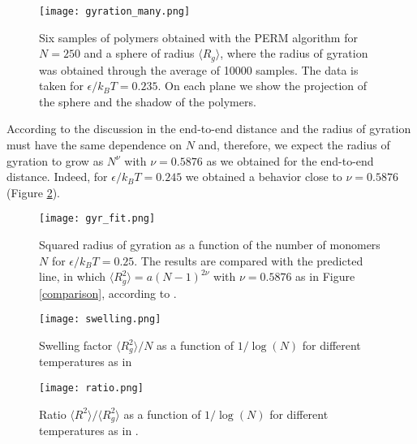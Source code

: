 \documentclass[aps,prl,reprint,groupedaddress]{revtex4-1}
\begin{document}
\begin{figure}[tb]
	\texttt{[image: gyration\_many.png]}
	\caption{Six samples of polymers obtained with the PERM algorithm for $N=250$ and a sphere of radius $\langle R_g\rangle$, where the radius of gyration was obtained through the average of 10000 samples. The data is taken for $\epsilon/k_B T = 0.235$. On each plane we show the projection of the sphere and the shadow of the polymers. \label{gyration_idea}}
\end{figure}

According to the discussion in \cite{Smith1975} the end-to-end distance and the radius of gyration must have the same dependence on $N$ and, therefore, we expect the radius of gyration to grow as $N^{\nu}$ with $\nu = 0.5876$ as we obtained for the end-to-end distance. Indeed, for $\epsilon/k_B T = 0.245$ we obtained a behavior close to $\nu = 0.5876$ (Figure \ref{gyr_fit}).

\begin{figure}[tb]
	\texttt{[image: gyr\_fit.png]}
	\caption{Squared radius of gyration as a function of the number of monomers $N$ for $\epsilon/k_B T = 0.25$. The results are compared with the predicted line, in which $\langle R_g^2\rangle = a(N-1)^{2 \nu}$ with $\nu = 0.5876$ as in Figure \ref{comparison}, according to \cite{Smith1975}. \label{gyr_fit}}
\end{figure}

\begin{figure}[tb]
	\texttt{[image: swelling.png]}
	\caption{Swelling factor $\langle R_g^2\rangle/N$ as a function of $1/\log(N)$ for different temperatures as in \cite{Grassberger1997} \label{swell}}
\end{figure}

\begin{figure}[tb]
	\texttt{[image: ratio.png]}
	\caption{Ratio $\langle R^2\rangle/\langle R_g^2\rangle$ as a function of $1/\log(N)$ for different temperatures as in \cite{Grassberger1997}. \label{ratio}}
\end{figure}
\end{document}
